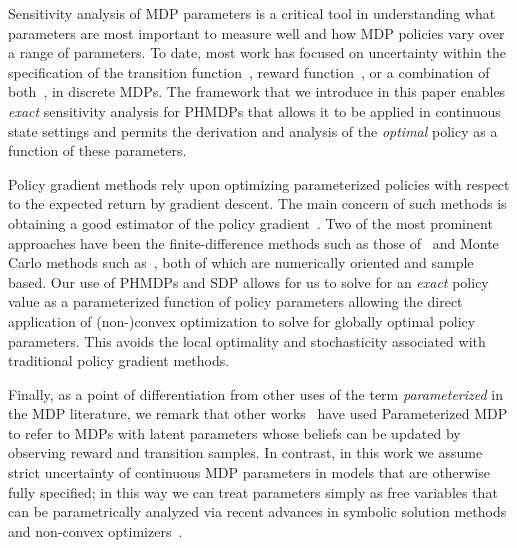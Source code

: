 Sensitivity analysis of MDP parameters is a critical tool in understanding what parameters are most important to measure well and how MDP policies vary over a range of parameters.  To date, most work has focused on uncertainty within the specification of the transition function~\parencite{Kalyanasundaram_AJC_2004}, reward function~\parencite{Tan_JAP_2011, Hopp_JOTA_1988}, or a combination of both~\parencite{Givan_AI_2000}, in discrete MDPs. The framework that we introduce in this paper enables \textit{exact} sensitivity analysis for PHMDPs that allows it to be applied in continuous state settings and permits the derivation and analysis of the \emph{optimal} policy as a function of these parameters.

Policy gradient methods rely upon optimizing parameterized policies with respect to the expected return by gradient descent. The main concern of such methods is obtaining a good estimator of the policy gradient~\parencite{Peters_IRS_2006}. Two of the most prominent approaches have been the finite-difference methods such as those of~\parencite{Ng_UAI_2000} and Monte Carlo methods such as~\parencite{Sutton_NIPS_1999,Baxter_ISCAS_2000}, both of which are numerically oriented and sample based. Our use of PHMDPs and SDP allows for us to solve for an \textit{exact} policy value as a parameterized function of policy parameters allowing the direct application of (non-)convex optimization to solve for globally optimal policy parameters. This avoids the local optimality and stochasticity associated with traditional policy gradient methods.

Finally, as a point of differentiation from other uses of the term \emph{parameterized} in the MDP literature, we remark that other works~\parencite{Doshi-VelezK16,Duff_UMA_2002,Dearden_UAI_1999,Gopalan_COLT_2015} have used Parameterized MDP to refer to MDPs with latent parameters whose beliefs can be updated by observing reward and transition samples. In contrast, in this work we assume strict uncertainty of continuous MDP parameters in models that are otherwise fully specified; in this way we can treat parameters simply as free variables that can be parametrically analyzed via recent advances in symbolic solution methods and non-convex optimizers~\parencite{Gao2013}.


